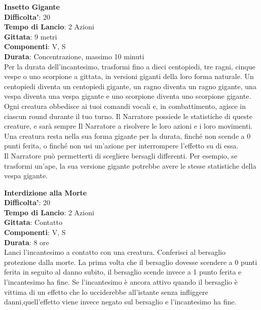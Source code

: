 \begin{multicols}{2}
\medskip\textbf{Insetto Gigante}\\
\textbf{Difficolta'}: 20\\
\textbf{Tempo di Lancio}: 2 Azioni\\
\textbf{Gittata}: 9 metri\\
\textbf{Componenti}: V, S\\
\textbf{Durata}: Concentrazione, massimo 10 minuti\\
Per la durata dell’incantesimo, trasformi fino a dieci centopiedi, tre ragni, cinque vespe o uno scorpione a gittata, in versioni giganti della loro forma naturale. Un centopiedi diventa un centopiedi gigante, un ragno diventa un ragno gigante, una vespa diventa una vespa gigante e uno scorpione diventa uno scorpione gigante. Ogni creatura obbedisce ai tuoi comandi vocali e, in combattimento, agisce in ciascun round durante il tuo turno. Il Narratore possiede le statistiche di queste creature, e sarà sempre Il Narratore a risolvere le loro azioni e i loro movimenti. Una creatura resta nella sua forma gigante per la durata, finché non scende a 0 punti ferita, o finché non usi un’azione per interrompere l’effetto su di essa.\\
Il Narratore può permetterti di scegliere bersagli differenti. Per esempio, se trasformi un’ape, la sua versione gigante potrebbe avere le stesse statistiche della vespa gigante.

\medskip\textbf{Interdizione alla Morte}\\
\textbf{Difficolta'}: 20\\
\textbf{Tempo di Lancio}: 2 Azioni\\
\textbf{Gittata}: Contatto\\
\textbf{Componenti}: V, S\\
\textbf{Durata}: 8 ore\\
Lanci l’incantesimo a contatto con una creatura. Conferisci al bersaglio protezione dalla morte. La prima volta che il bersaglio dovesse scendere a 0 punti ferita in seguito al danno subito, il bersaglio scende invece a 1 punto ferita e l’incantesimo ha fine. Se l’incantesimo è ancora attivo quando il bersaglio è vittima di un effetto che lo ucciderebbe all’istante senza infliggere danni,quell’effetto viene invece negato sul bersaglio e l’incantesimo ha fine.


\end{multicols}

